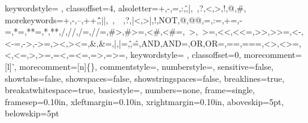 {  keywordstyle={\color{spin_ctrl} \bf},  
  classoffset=4,
  alsoletter={+,-,=,:,\^,|,~,?,<,>,!,@,\#},
  morekeywords={+,-,--,++,\^\^,||,~,~~,?,|<,>|,!,NOT,@,@@,=,:=,+=,-=,*=,**=,*,**,/,//,/=,//=,\#>,\#>=,<\#,<\#=,~>,~>=,<<,<<=,>>,>>=,<-,<-=,->,->=,><,><=,\&,\&=,|,|=,\^,\^=,AND,AND=,OR,OR=,==,===,<>,<>=,<,<=,>,>=,=<,=<=,=>,=>=},
  keywordstyle={\color{spin_operator} \bf},  
  classoffset=0,
  morecomment=[l]{'},
  morecomment=[n]{\{}{\}},
  commentstyle=\color{spin_comment},
  numberstyle=\color{spin_num},
  sensitive=false,
  showtabs=false,
  showspaces=false,
  showstringspaces=false,
  breaklines=true,
  breakatwhitespace=true,
  basicstyle=\footnotesize\ttfamily,
  numbers=none,
  frame=single,
  framesep=0.10in,
  xleftmargin=0.10in,
  xrightmargin=0.10in,
  aboveskip=5pt,
  belowskip=5pt
}







